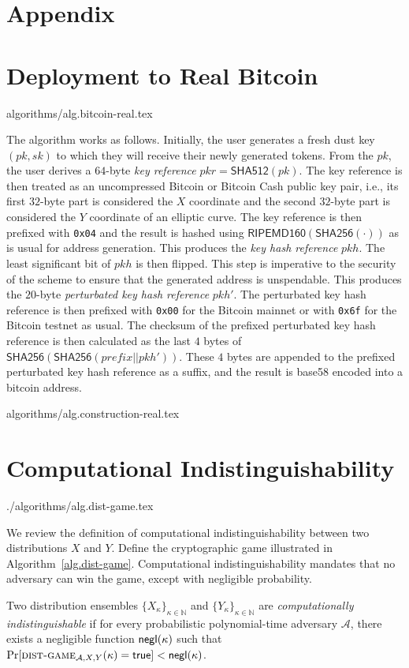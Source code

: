 \section*{Appendix}
\section{Deployment to Real Bitcoin}
{algorithms/alg.bitcoin-real.tex}

The algorithm works as follows. Initially, the user generates a fresh dust key
$(pk, sk)$ to which they will receive their newly generated tokens.  From the $pk$, the user derives a $64$-byte
\emph{key reference} $pkr = \textsf{SHA512}(pk)$. The key reference is then
treated as an uncompressed Bitcoin or Bitcoin Cash public key pair, i.e., its
first $32$-byte part is considered the $X$ coordinate and the second $32$-byte
part is considered the $Y$ coordinate of an elliptic curve. The key reference is
then prefixed with \texttt{0x04} and the result is hashed using
$\textsf{RIPEMD160}(\textsf{SHA256}(\cdot))$ as is usual for address generation.
This produces the \emph{key hash reference} $pkh$. The least significant bit of
$pkh$ is then flipped. This step is imperative to the security of the scheme to
ensure that the generated address is unspendable. This produces the $20$-byte
\emph{perturbated key hash reference} $pkh'$. The perturbated key hash reference
is then prefixed with \texttt{0x00} for the Bitcoin mainnet or with
\texttt{0x6f} for the Bitcoin testnet as usual. The checksum of the prefixed
perturbated key hash reference is then calculated as the last $4$ bytes of
$\textsf{SHA256}(\textsf{SHA256}(prefix || pkh'))$. These $4$ bytes are appended
to the prefixed perturbated key hash reference as a suffix, and the result is
\textsf{base58} encoded into a bitcoin address.

{algorithms/alg.construction-real.tex}

\section{Computational Indistinguishability}\label{sec.comp-ind}

{./algorithms/alg.dist-game.tex}

We review the definition of computational indistinguishability between two
distributions $X$ and $Y$. Define the cryptographic game illustrated in
Algorithm~\ref{alg.dist-game}.
Computational indistinguishability mandates that no adversary can win the game,
except with negligible probability.

\begin{definition}
  Two distribution ensembles $\{X_\kappa\}_{\kappa\in\mathbb{N}}$ and $\{Y_\kappa\}_{\kappa\in\mathbb{N}}$ are
  \emph{computationally indistinguishable}
  if for every probabilistic polynomial-time adversary $\mathcal{A}$,
  there exists a negligible function $\textsf{negl}(\kappa)$ such that
  $\Pr[\textsc{dist-game}_{\mathcal{A},X,Y}(\kappa) = \mathsf{true}] < \textsf{negl}(\kappa)$.
\end{definition}
